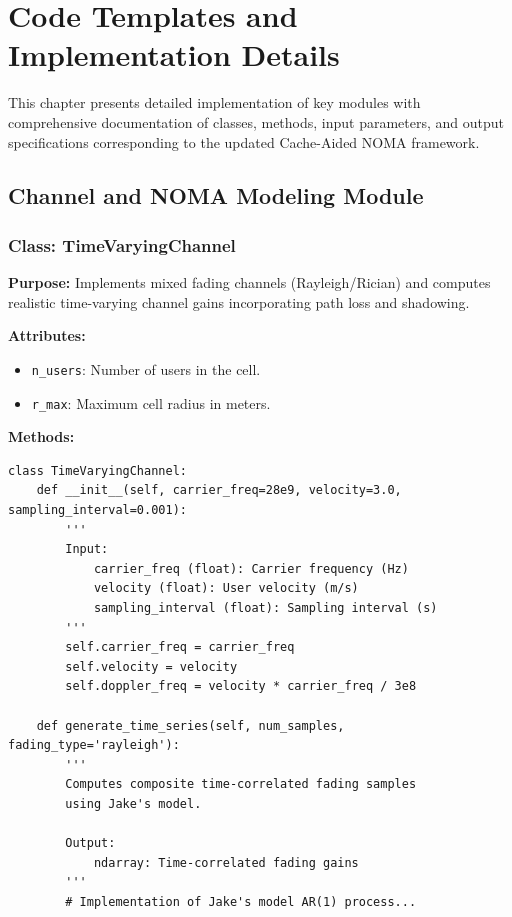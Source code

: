 \documentclass[12pt,a4paper]{article}
\begin{document}
\thispagestyle{plain}


\clearpage

\section{Code Templates and Implementation Details}

This chapter presents detailed implementation of key modules with comprehensive documentation of classes, methods, input parameters, and output specifications corresponding to the updated Cache-Aided NOMA framework.

\subsection{Channel and NOMA Modeling Module}

\subsubsection{Class: TimeVaryingChannel}

\textbf{Purpose:} Implements mixed fading channels (Rayleigh/Rician) and computes realistic time-varying channel gains incorporating path loss and shadowing.

\textbf{Attributes:}
\begin{itemize}
    \item \texttt{n\_users}: Number of users in the cell.
    \item \texttt{r\_max}: Maximum cell radius in meters.
\end{itemize}

\textbf{Methods:}
\begin{verbatim}
class TimeVaryingChannel:
    def __init__(self, carrier_freq=28e9, velocity=3.0, sampling_interval=0.001):
        '''
        Input:
            carrier_freq (float): Carrier frequency (Hz)
            velocity (float): User velocity (m/s)
            sampling_interval (float): Sampling interval (s)
        '''
        self.carrier_freq = carrier_freq
        self.velocity = velocity
        self.doppler_freq = velocity * carrier_freq / 3e8
    
    def generate_time_series(self, num_samples, fading_type='rayleigh'):
        '''
        Computes composite time-correlated fading samples 
        using Jake's model.
        
        Output:
            ndarray: Time-correlated fading gains
        '''
        # Implementation of Jake's model AR(1) process...
\end{verbatim}
\end{document}
